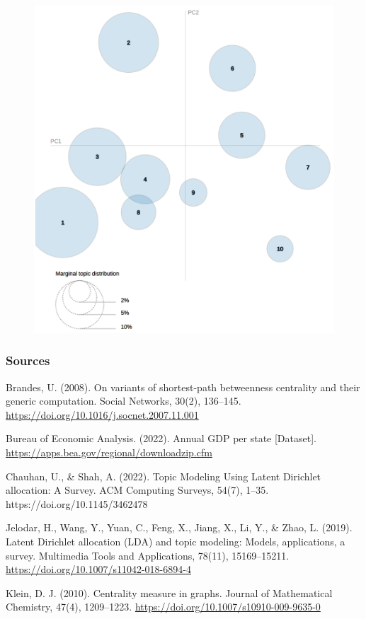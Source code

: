 \documentclass{beamer}
\begin{document}
\begin{frame}
\begin{figure}
\includegraphics[width=0.4\linewidth]{../visualizations/lda_after_visualization.png}
\end{figure}

\end{frame}


\begin{frame}
\frametitle{Sources}

Brandes, U. (2008). On variants of shortest-path betweenness centrality and their generic computation. Social Networks, 30(2), 136–145. \url{https://doi.org/10.1016/j.socnet.2007.11.001} \\

\vspace{5px}

Bureau of Economic Analysis. (2022). Annual GDP per state [Dataset]. \url{https://apps.bea.gov/regional/downloadzip.cfm}

\vspace{5px}

Chauhan, U., \& Shah, A. (2022). Topic Modeling Using Latent Dirichlet allocation: A Survey. ACM Computing Surveys, 54(7), 1–35. https://doi.org/10.1145/3462478

\vspace{5px}

Jelodar, H., Wang, Y., Yuan, C., Feng, X., Jiang, X., Li, Y., \& Zhao, L. (2019). Latent Dirichlet allocation (LDA) and topic modeling: Models, applications, a survey. Multimedia Tools and Applications, 78(11), 15169–15211. \url{https://doi.org/10.1007/s11042-018-6894-4}

\vspace{5px}

Klein, D. J. (2010). Centrality measure in graphs. Journal of Mathematical Chemistry, 47(4), 1209–1223. \url{https://doi.org/10.1007/s10910-009-9635-0}
 
\end{frame}
\end{document}
